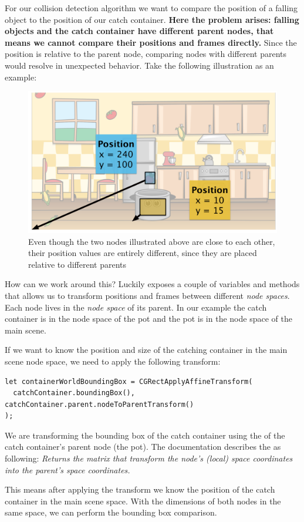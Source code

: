 For our collision detection algorithm we want to compare the position of a
falling object to the position of our catch container. \textbf{Here the problem
arises: falling objects and the catch container have different parent nodes,
that means we cannot compare their positions and frames directly.} Since the
position is relative to the parent node, comparing nodes with different parents
would resolve in unexpected behavior. Take the following illustration as an
example:
\begin{figure}[H]
		\centering
		\includegraphics[width=0.7\linewidth]{images/Chapter3/parent_transform.png}
		\caption{Even though the two nodes illustrated above are close to each other,
		their position values are entirely different, since they are placed relative
		to different parents}
\end{figure}
How can we work around this? Luckily \cocos{} exposes a couple of variables and
methods that allows us to transform positions and frames between different
\textit{node spaces}. Each node lives in the \textit{node space} of its parent.
In our example the catch container is in the node space of the pot and the pot is
in the node space of the main scene.

If we want to know the position and size of the catching container in the main
scene node space, we need to apply the following transform:
\begin{lstlisting}
let containerWorldBoundingBox = CGRectApplyAffineTransform(
  catchContainer.boundingBox(), catchContainer.parent.nodeToParentTransform()
);
\end{lstlisting}
We are transforming the bounding box of the catch container using the
 of the catch container's parent node (the
pot). The \cocos{} documentation describes the
 as following: \textit{Returns the matrix that
transform the node's (local) space coordinates into the parent's space coordinates.}

This means after applying the transform we know the position of the catch
container in the main scene space. With the dimensions of both nodes in the same
space, we can perform the bounding box comparison.

